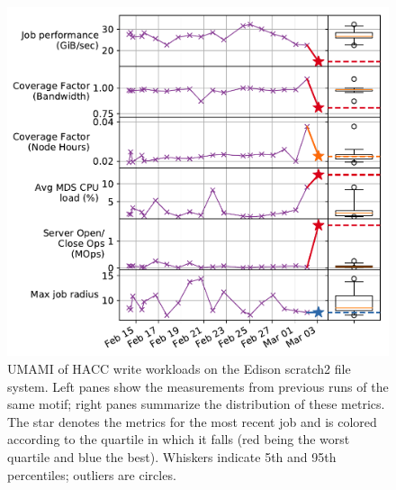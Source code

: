 \begin{figure}[t]
    \centering
    \includegraphics[width=1.0\columnwidth]{figs/umami-scratch2-hacc-write.pdf}
    \vspace{-.25in}
    \caption{UMAMI of HACC write workloads on the Edison scratch2 file system.
    Left panes show the measurements from previous runs of the same motif; right panes summarize the distribution of these metrics.
    The star denotes the metrics for the most recent job and is colored according to the quartile in which it falls (red being the worst quartile and blue the best).
    Whiskers indicate 5th and 95th percentiles; outliers are circles.}
    \label{fig:umami-scratch2-hacc-write}
    \vspace{-.2in}
\end{figure}

